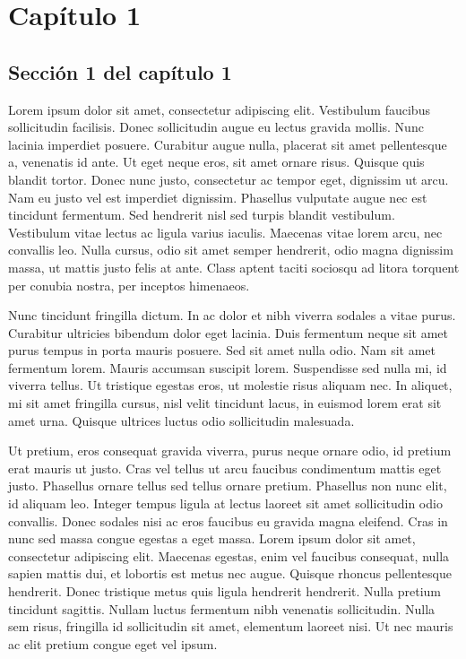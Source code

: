 \chapter{Capítulo 1}\label{ch:capitulo}

\section{Sección 1 del capítulo 1}
Lorem ipsum dolor sit amet, consectetur adipiscing elit. Vestibulum faucibus
sollicitudin facilisis. Donec sollicitudin augue eu lectus gravida mollis.
Nunc lacinia imperdiet posuere. Curabitur augue nulla, placerat sit amet
pellentesque a, venenatis id ante. Ut eget neque eros, sit amet ornare risus.
Quisque quis blandit tortor. Donec nunc justo, consectetur ac tempor eget,
dignissim ut arcu. Nam eu justo vel est imperdiet dignissim. Phasellus
vulputate augue nec est tincidunt fermentum. Sed hendrerit nisl sed turpis
blandit vestibulum. Vestibulum vitae lectus ac ligula varius iaculis. Maecenas
vitae lorem arcu, nec convallis leo. Nulla cursus, odio sit amet semper
hendrerit, odio magna dignissim massa, ut mattis justo felis at ante. Class
aptent taciti sociosqu ad litora torquent per conubia nostra, per inceptos
himenaeos.

Nunc tincidunt fringilla dictum. In ac dolor et nibh viverra sodales a vitae
purus. Curabitur ultricies bibendum dolor eget lacinia. Duis fermentum neque
sit amet purus tempus in porta mauris posuere. Sed sit amet nulla odio. Nam
sit amet fermentum lorem. Mauris accumsan suscipit lorem. Suspendisse sed
nulla mi, id viverra tellus. Ut tristique egestas eros, ut molestie risus
aliquam nec. In aliquet, mi sit amet fringilla cursus, nisl velit tincidunt
lacus, in euismod lorem erat sit amet urna. Quisque ultrices luctus odio
sollicitudin malesuada.

Ut pretium, eros consequat gravida viverra, purus neque ornare odio, id
pretium erat mauris ut justo. Cras vel tellus ut arcu faucibus condimentum
mattis eget justo. Phasellus ornare tellus sed tellus ornare pretium.
Phasellus non nunc elit, id aliquam leo. Integer tempus ligula at lectus
laoreet sit amet sollicitudin odio convallis. Donec sodales nisi ac eros
faucibus eu gravida magna eleifend. Cras in nunc sed massa congue egestas a
eget massa. Lorem ipsum dolor sit amet, consectetur adipiscing elit. Maecenas
egestas, enim vel faucibus consequat, nulla sapien mattis dui, et lobortis est
metus nec augue. Quisque rhoncus pellentesque hendrerit. Donec tristique metus
quis ligula hendrerit hendrerit. Nulla pretium tincidunt sagittis. Nullam
luctus fermentum nibh venenatis sollicitudin. Nulla sem risus, fringilla id
sollicitudin sit amet, elementum laoreet nisi. Ut nec mauris ac elit pretium
congue eget vel ipsum.

